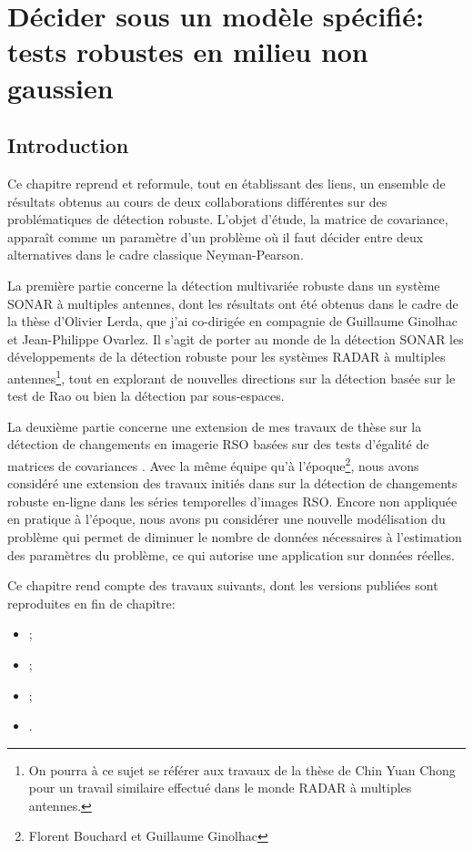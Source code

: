 \chapter{Décider sous un modèle spécifié: tests robustes en milieu non gaussien}
\label{ch:robust-detection}
\section{Introduction}
\label{sec:detection-introduction}


Ce chapitre reprend et reformule, tout en établissant des liens, un ensemble de résultats obtenus au cours de deux collaborations différentes sur des problématiques de détection robuste. L'objet d'étude, la matrice de covariance, apparaît comme un paramètre d'un problème où il faut décider entre deux alternatives dans le cadre classique Neyman-Pearson.

La première partie concerne la détection multivariée robuste dans un système SONAR à multiples antennes, dont les résultats ont été obtenus dans le cadre de la thèse d'Olivier Lerda, que j'ai co-dirigée en compagnie de Guillaume Ginolhac et Jean-Philippe Ovarlez. Il s'agit de porter au monde de la détection SONAR les développements de la détection robuste pour les systèmes RADAR à multiples antennes\footnote{On pourra à ce sujet se référer aux travaux de la thèse de Chin Yuan Chong \cite{chong:tel-00772006} pour un travail similaire effectué dans le monde RADAR à multiples antennes.}, tout en explorant de nouvelles directions sur la détection basée sur le test de Rao ou bien la détection par sous-espaces.


La deuxième partie concerne une extension de mes travaux de thèse sur la détection de changements en imagerie RSO basées sur des tests d'égalité de matrices de covariances \cite{Mian_2019}. Avec la même équipe qu'à l'époque\footnote{Florent Bouchard et Guillaume Ginolhac}, nous avons considéré une extension des travaux initiés dans \cite{Bouchard_2020} sur la détection de changements robuste en-ligne dans les séries temporelles d'images RSO. Encore non appliquée en pratique à l'époque, nous avons pu considérer une nouvelle modélisation du problème qui permet de diminuer le nombre de données nécessaires à l'estimation des paramètres du problème, ce qui autorise une application sur données réelles.

\begin{contributions}
  Ce chapitre rend compte des travaux suivants, dont les versions publiées sont
  reproduites en fin de chapitre:
  \begin{itemize}
    \item {};
    \item {};
    \item {};
    \item {}.
  \end{itemize}
\end{contributions}

